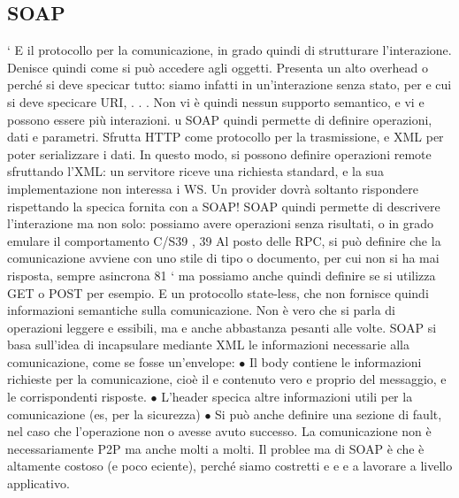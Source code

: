 \documentclass[a4paper,12pt]{article}
\begin{document}
\subsection{SOAP}
`
E il protocollo per la comunicazione, in grado quindi di strutturare l'interazione.
Denisce quindi come si può accedere agli oggetti. Presenta un alto overhead
o
perché si deve specicar tutto: siamo infatti in un'interazione senza stato, per
e
cui si deve specicare URI, . . . Non vi è quindi nessun supporto semantico, e vi
e
possono essere più interazioni.
u
SOAP quindi permette di definire operazioni, dati e parametri. Sfrutta
HTTP come protocollo per la trasmissione, e XML per poter serializzare i dati.
In questo modo, si possono definire operazioni remote sfruttando l'XML: un
servitore riceve una richiesta standard, e la sua implementazione non interessa i
WS. Un provider dovrà soltanto rispondere rispettando la specica fornita con
a
SOAP!
SOAP quindi permette di descrivere l'interazione ma non solo: possiamo
avere operazioni senza risultati, o in grado emulare il comportamento C/S39 ,
39 Al posto delle RPC, si può definire che la comunicazione avviene con uno stile di tipo
o
documento, per cui non si ha mai risposta, sempre asincrona
81
`
ma possiamo anche quindi definire se si utilizza GET o POST per esempio. E
un protocollo state-less, che non fornisce quindi informazioni semantiche sulla
comunicazione. Non è vero che si parla di operazioni leggere e essibili, ma
e
anche abbastanza pesanti alle volte.
SOAP si basa sull'idea di incapsulare mediante XML le informazioni necessarie alla comunicazione, come se fosse
un'envelope:
$\bullet$ Il body contiene le informazioni richieste per la comunicazione, cioè il
e
contenuto vero e proprio del messaggio, e le corrispondenti risposte.
$\bullet$ L'header specica altre informazioni utili per la comunicazione (es, per la
sicurezza)
$\bullet$ Si può anche definire una sezione di fault, nel caso che l'operazione non
o
avesse avuto successo.
La comunicazione non è necessariamente P2P ma anche molti a molti. Il problee
ma di SOAP è che è altamente costoso (e poco eciente), perché siamo costretti
e
e
e
a lavorare a livello applicativo.
\end{document}
